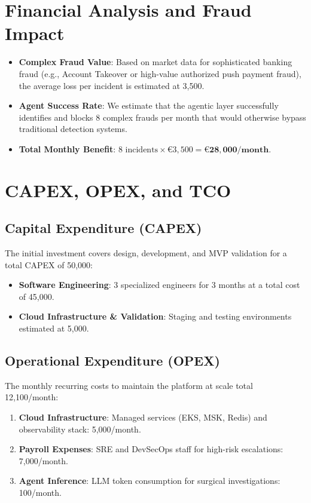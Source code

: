 \documentclass[12pt]{report}
\begin{document}
\section{Financial Analysis and Fraud Impact}
\begin{itemize}
    \item \textbf{Complex Fraud Value}: Based on market data for sophisticated banking fraud (e.g., Account Takeover or high-value authorized push payment fraud), the average loss per incident is estimated at 3,500.
    \item \textbf{Agent Success Rate}: We estimate that the agentic layer successfully identifies and blocks 8 complex frauds per month that would otherwise bypass traditional detection systems.
    \item \textbf{Total Monthly Benefit}: $8 \text{ incidents} \times \text{€}3,500 = \mathbf{\text{€}28,000/\text{month}}$.
\end{itemize}

\section{CAPEX, OPEX, and TCO}

\subsection{Capital Expenditure (CAPEX)}
The initial investment covers design, development, and MVP validation for a total CAPEX of 50,000:
\begin{itemize}
    \item \textbf{Software Engineering}: 3 specialized engineers for 3 months at a total cost of 45,000.
    \item \textbf{Cloud Infrastructure \& Validation}: Staging and testing environments estimated at 5,000.
\end{itemize}

\subsection{Operational Expenditure (OPEX)}
The monthly recurring costs to maintain the platform at scale total 12,100/month:
\begin{enumerate}
    \item \textbf{Cloud Infrastructure}: Managed services (EKS, MSK, Redis) and observability stack: 5,000/month.
    \item \textbf{Payroll Expenses}: SRE and DevSecOps staff for high-risk escalations: 7,000/month.
    \item \textbf{Agent Inference}: LLM token consumption for surgical investigations: 100/month.
\end{enumerate}
\end{document}
